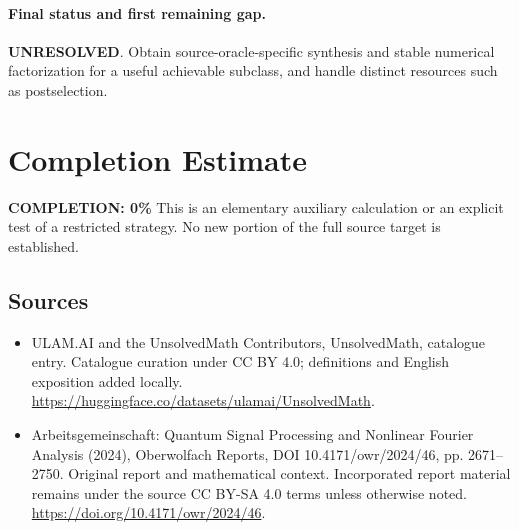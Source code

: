 \documentclass[11pt]{article}
\begin{document}
\paragraph{Final status and first remaining gap.}
\textbf{UNRESOLVED}. Obtain source-oracle-specific synthesis and stable numerical factorization for a useful achievable subclass, and handle distinct resources such as postselection.

\section{Completion Estimate}
\noindent\textbf{COMPLETION: 0\%}
This is an elementary auxiliary calculation or an explicit test of a restricted strategy. No new portion of the full source target is established.

\subsection{Sources}
\begin{itemize}
\item[\hypertarget{source:statement:1}{S1}] ULAM.AI and the UnsolvedMath Contributors, UnsolvedMath, catalogue entry. Catalogue curation under CC BY 4.0; definitions and English exposition added locally.
\url{https://huggingface.co/datasets/ulamai/UnsolvedMath}.
\item[\hypertarget{source:statement:2}{S2}] Arbeitsgemeinschaft: Quantum Signal Processing and Nonlinear Fourier Analysis (2024), Oberwolfach Reports, DOI 10.4171/owr/2024/46, pp. 2671--2750. Original report and mathematical context. Incorporated report material remains under the source CC BY-SA 4.0 terms unless otherwise noted.
\url{https://doi.org/10.4171/owr/2024/46}.
\end{itemize}
\label{end:statement}
\end{document}
